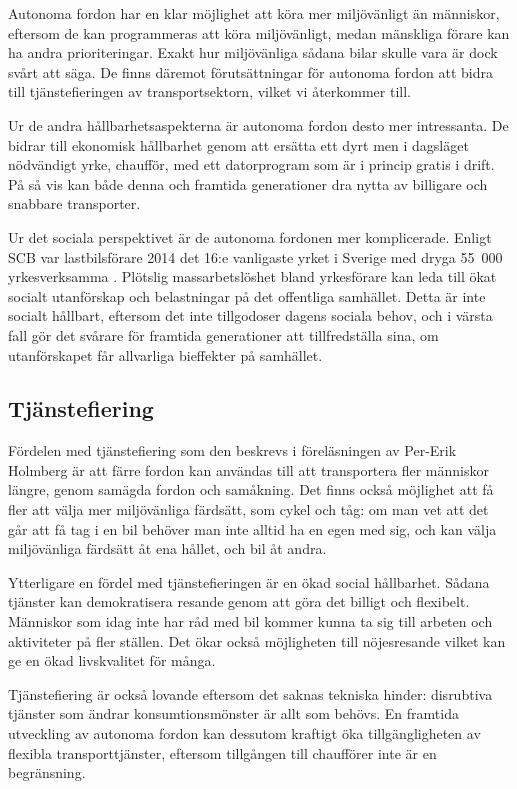 \documentclass{article}
\begin{document}
Autonoma fordon har en klar möjlighet att köra mer miljövänligt än människor, eftersom de kan programmeras att köra miljövänligt, medan mänskliga förare kan ha andra prioriteringar. Exakt hur miljövänliga sådana bilar skulle vara är dock svårt att säga. De finns däremot förutsättningar för autonoma fordon att bidra till tjänstefieringen av transportsektorn, vilket vi återkommer till.

Ur de andra hållbarhetsaspekterna är autonoma fordon desto mer intressanta. De bidrar till ekonomisk hållbarhet genom att ersätta ett dyrt men i dagsläget nödvändigt yrke, chaufför, med ett datorprogram som är i princip gratis i drift. På så vis kan både denna och framtida generationer dra nytta av billigare och snabbare transporter.

Ur det sociala perspektivet är de autonoma fordonen mer komplicerade. Enligt SCB var lastbilsförare 2014 det 16:e vanligaste yrket i Sverige med dryga 55\ 000 yrkesverksamma . Plötslig massarbetslöshet bland yrkesförare kan leda till ökat socialt utanförskap och belastningar på det offentliga samhället. Detta är inte socialt hållbart, eftersom det inte tillgodoser dagens sociala behov, och i värsta fall gör det svårare för framtida generationer att tillfredställa sina, om utanförskapet får allvarliga bieffekter på samhället.

\subsection{Tjänstefiering}

Fördelen med tjänstefiering som den beskrevs i föreläsningen av Per-Erik Holmberg är att färre fordon kan användas till att transportera fler människor längre, genom samägda fordon och samåkning. Det finns också möjlighet att få fler att välja mer miljövänliga färdsätt, som cykel och tåg: om man vet att det går att få tag i en bil behöver man inte alltid ha en egen med sig, och kan välja miljövänliga färdsätt åt ena hållet, och bil åt andra. 

Ytterligare en fördel med tjänstefieringen är en ökad social hållbarhet. Sådana tjänster kan demokratisera resande genom att göra det billigt och flexibelt. Människor som idag inte har råd med bil kommer kunna ta sig till arbeten och aktiviteter på fler ställen. Det ökar också möjligheten till nöjesresande vilket kan ge en ökad livskvalitet för många.

Tjänstefiering är också lovande eftersom det saknas tekniska hinder: disrubtiva tjänster som ändrar konsumtionsmönster är allt som behövs. En framtida utveckling av autonoma fordon kan dessutom kraftigt öka tillgängligheten av flexibla transporttjänster, eftersom tillgången till chaufförer inte är en begränsning.
\end{document}
